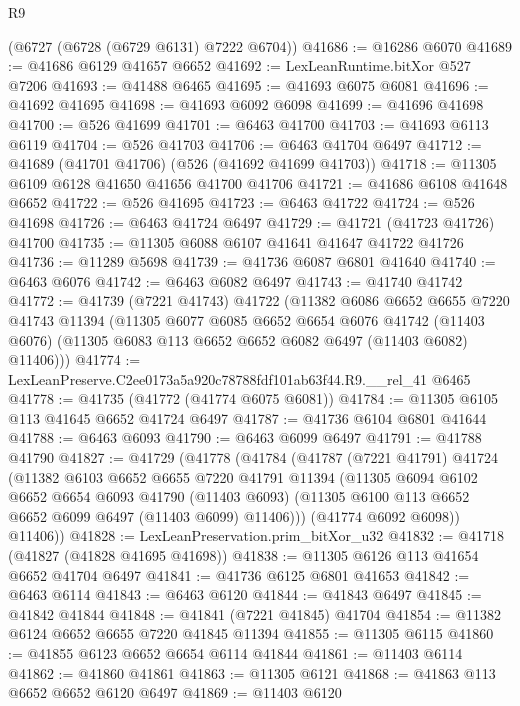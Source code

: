\begin{lexlean}{R9}
\begin{coremodule}
    (@6727 (@6728 (@6729 @6131) @7222 @6704))
@41686 := @16286 @6070
@41689 := @41686 @6129 @41657 @6652
@41692 := LexLeanRuntime.bitXor @527 @7206
@41693 := @41488 @6465
@41695 := @41693 @6075 @6081
@41696 := @41692 @41695
@41698 := @41693 @6092 @6098
@41699 := @41696 @41698
@41700 := @526 @41699
@41701 := @6463 @41700
@41703 := @41693 @6113 @6119
@41704 := @526 @41703
@41706 := @6463 @41704 @6497
@41712 := @41689 (@41701 @41706) (@526 (@41692 @41699 @41703))
@41718 := @11305 @6109 @6128 @41650 @41656 @41700 @41706
@41721 := @41686 @6108 @41648 @6652
@41722 := @526 @41695
@41723 := @6463 @41722
@41724 := @526 @41698
@41726 := @6463 @41724 @6497
@41729 := @41721 (@41723 @41726) @41700
@41735 := @11305 @6088 @6107 @41641 @41647 @41722 @41726
@41736 := @11289 @5698
@41739 := @41736 @6087 @6801 @41640
@41740 := @6463 @6076
@41742 := @6463 @6082 @6497
@41743 := @41740 @41742
@41772 := @41739
    (@7221 @41743)
    @41722
    (@11382
      @6086
      @6652
      @6655
      @7220
      @41743
      @11394
      (@11305
        @6077
        @6085
        @6652
        @6654
        @6076
        @41742
        (@11403 @6076)
        (@11305 @6083 @113 @6652 @6652 @6082 @6497 (@11403 @6082) @11406)))
@41774 := LexLeanPreserve.C2ee0173a5a920c78788fdf101ab63f44.R9.__rel_41 @6465
@41778 := @41735 (@41772 (@41774 @6075 @6081))
@41784 := @11305 @6105 @113 @41645 @6652 @41724 @6497
@41787 := @41736 @6104 @6801 @41644
@41788 := @6463 @6093
@41790 := @6463 @6099 @6497
@41791 := @41788 @41790
@41827 := @41729
    (@41778
      (@41784
        (@41787
          (@7221 @41791)
          @41724
          (@11382
            @6103
            @6652
            @6655
            @7220
            @41791
            @11394
            (@11305
              @6094
              @6102
              @6652
              @6654
              @6093
              @41790
              (@11403 @6093)
              (@11305 @6100 @113 @6652 @6652 @6099 @6497 (@11403 @6099) @11406)))
          (@41774 @6092 @6098))
        @11406))
@41828 := LexLeanPreservation.prim_bitXor_u32
@41832 := @41718 (@41827 (@41828 @41695 @41698))
@41838 := @11305 @6126 @113 @41654 @6652 @41704 @6497
@41841 := @41736 @6125 @6801 @41653
@41842 := @6463 @6114
@41843 := @6463 @6120
@41844 := @41843 @6497
@41845 := @41842 @41844
@41848 := @41841 (@7221 @41845) @41704
@41854 := @11382 @6124 @6652 @6655 @7220 @41845 @11394
@41855 := @11305 @6115
@41860 := @41855 @6123 @6652 @6654 @6114 @41844
@41861 := @11403 @6114
@41862 := @41860 @41861
@41863 := @11305 @6121
@41868 := @41863 @113 @6652 @6652 @6120 @6497
@41869 := @11403 @6120

\end{coremodule}
\end{lexlean}
